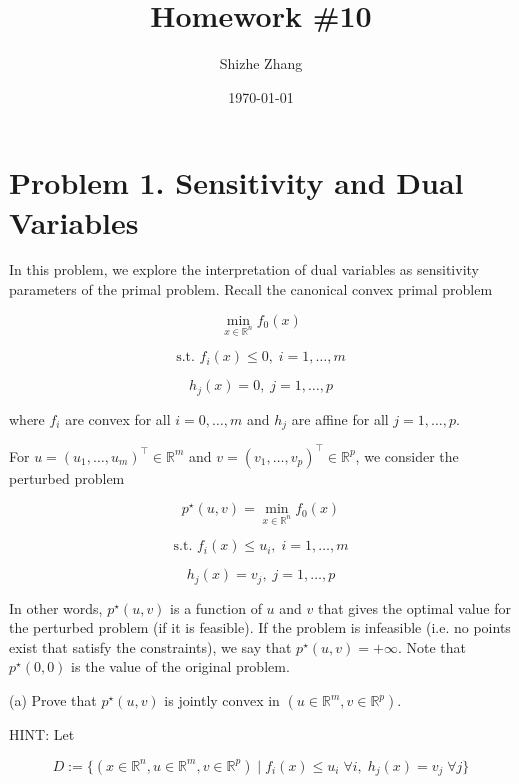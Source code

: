 \documentclass[
	12pt,
]{fphw}
\title{Homework \#10} %
\author{Shizhe Zhang} %
\date{\today} %
\institute{University of California, Berkeley \\ Department of Statistics} %
\begin{document}
\maketitle %


\section*{Problem 1. Sensitivity and Dual Variables}

In this problem, we explore the interpretation of dual variables as sensitivity parameters of the primal problem.
Recall the canonical convex primal problem

\[
\min_{x \in \mathbb{R}^n} f_0(x)
\tag{1}
\]

\[
\text{s.t. } f_i(x) \le 0, \; i = 1, \ldots, m
\tag{2}
\]

\[
h_j(x) = 0, \; j = 1, \ldots, p
\tag{3}
\]

where \(f_i\) are convex for all \(i = 0, \ldots, m\) and \(h_j\) are affine for all \(j = 1, \ldots, p\).

For \(u = (u_1, \ldots, u_m)^\top \in \mathbb{R}^m\) and \(v = (v_1, \ldots, v_p)^\top \in \mathbb{R}^p\), we consider the perturbed problem

\[
p^\star(u,v) = \min_{x \in \mathbb{R}^n} f_0(x)
\tag{4}
\]

\[
\text{s.t. } f_i(x) \le u_i, \; i = 1, \ldots, m
\tag{5}
\]

\[
h_j(x) = v_j, \; j = 1, \ldots, p
\tag{6}
\]

In other words, \(p^\star(u,v)\) is a function of \(u\) and \(v\) that gives the optimal value for the perturbed problem (if it is feasible). If the problem is infeasible (i.e. no points exist that satisfy the constraints), we say that \(p^\star(u,v) = +\infty\).
Note that \(p^\star(0,0)\) is the value of the original problem.

(a) Prove that \(p^\star(u,v)\) is jointly convex in \((u \in \mathbb{R}^m, v \in \mathbb{R}^p)\).

HINT: Let

\[
D := \{(x \in \mathbb{R}^n, u \in \mathbb{R}^m, v \in \mathbb{R}^p) \mid f_i(x) \le u_i \; \forall i, \; h_j(x) = v_j \; \forall j\}
\tag{7}
\]
\end{document}
